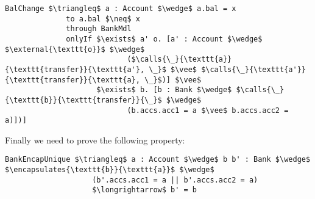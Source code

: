 \begin{lstlisting}[language = Chainmail, mathescape=true, frame=lines]
BalChange $\triangleq$ a : Account $\wedge$ a.bal = x
              to a.bal $\neq$ x
              through BankMdl
              onlyIf $\exists$ a' o. [a' : Account $\wedge$ $\external{\texttt{o}}$ $\wedge$ 
                            ($\calls{\_}{\texttt{a}}{\texttt{transfer}}{\texttt{a'}, \_}$ $\vee$ $\calls{\_}{\texttt{a'}}{\texttt{transfer}}{\texttt{a}, \_}$)] $\vee$
                     $\exists$ b. [b : Bank $\wedge$ $\calls{\_}{\texttt{b}}{\texttt{transfer}}{\_}$ $\wedge$ 
                            (b.accs.acc1 = a $\vee$ b.accs.acc2 = a)])]
\end{lstlisting}
Finally we need to prove the following property:
\begin{lstlisting}[language = Chainmail, mathescape=true, frame=lines]
BankEncapUnique $\triangleq$ a : Account $\wedge$ b b' : Bank $\wedge$ $\encapsulates{\texttt{b}}{\texttt{a}}$ $\wedge$
                    (b'.accs.acc1 = a || b'.accs.acc2 = a)
                    $\longrightarrow$ b' = b
\end{lstlisting}




